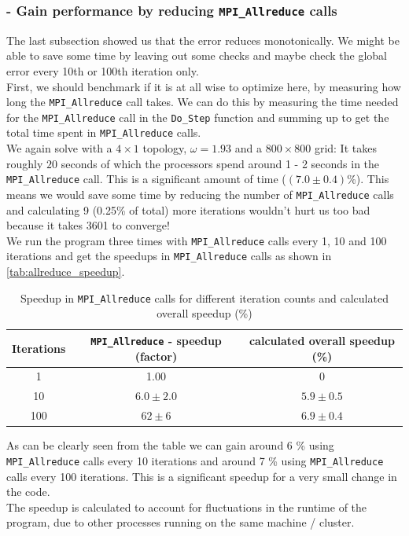 \subsubsection{ - Gain performance by reducing \texttt{MPI\_Allreduce} calls}
The last subsection showed us that the error reduces monotonically. We might be able to save some time by leaving out some checks and maybe check the global error every 10th or 100th iteration only.\\ First, we should benchmark if it is at all wise to optimize here, by measuring how long the \texttt{MPI\_Allreduce} call takes. We can do this by measuring the time needed for the \texttt{MPI\_Allreduce} call in the \texttt{Do\_Step} function and summing up to get the total time spent in \texttt{MPI\_Allreduce} calls.\\
We again solve with a $4 \times 1$ topology, $\omega = 1.93$ and a $800 \times 800$ grid: It takes roughly $20$ seconds of which the processors spend around 1 - 2 seconds in the \texttt{MPI\_Allreduce} call. This is a significant amount of time ($(7.0 \pm 0.4)$\%). This means we would save some time by reducing the number of \texttt{MPI\_Allreduce} calls and calculating 9 (0.25\% of total) more iterations wouldn't hurt us too bad because it takes 3601 to converge!\\
We run the program three times with \texttt{MPI\_Allreduce} calls every 1, 10 and 100 iterations and get the speedups in \texttt{MPI\_Allreduce} calls as shown in \autoref{tab:allreduce_speedup}.
\begin{table}[H]
    \centering
    \begin{tabular}{|c|c|c|}
        \hline
        Iterations & \texttt{MPI\_Allreduce} - speedup (factor) & calculated overall speedup (\%)\\\hline
        1  & 1.00 & 0\\\hline
        10 & $6.0 \pm 2.0$ & $ 5.9 \pm 0.5$\\\hline
        100& $62 \pm 6$    & $ 6.9 \pm 0.4$\\\hline
    \end{tabular}
    \caption{Speedup in \texttt{MPI\_Allreduce} calls for different iteration counts and calculated overall speedup (\%)}
    \label{tab:allreduce_speedup}
\end{table}
As can be clearly seen from the table we can gain around 6 \% using \texttt{MPI\_Allreduce} calls every 10 iterations and around 7 \% using \texttt{MPI\_Allreduce} calls every 100 iterations. This is a significant speedup for a very small change in the code.\\
 The speedup is calculated to account for fluctuations in the runtime of the program, due to other processes running on the same machine / cluster. 

